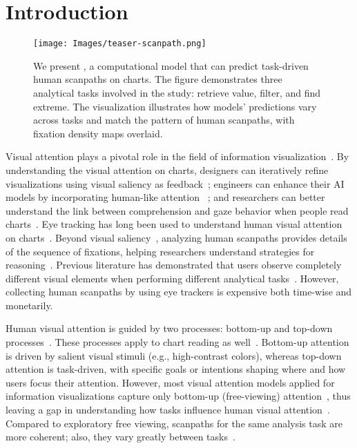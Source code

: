 \vspace{-0.5mm}
\section{Introduction}

\begin{figure*}[!t]
  \centering
  \texttt{[image: Images/teaser-scanpath.png]}
  \caption{We present \name, a computational model that can predict task-driven human scanpaths on charts. The figure demonstrates three analytical tasks involved in the study: retrieve value, filter, and find extreme. The visualization illustrates how models' predictions vary across tasks and match the pattern of human scanpaths, with fixation density maps overlaid.}
  \label{fig:teaser}
\end{figure*}

Visual attention plays a pivotal role in the field of information visualization~\cite{healey2011attention, borkin2015beyond}.
By understanding the visual attention on charts, designers can iteratively refine visualizations using visual saliency as feedback~\cite{shin2023perceptual}; engineers can enhance their AI models by incorporating human-like attention ~\cite{sood2023multimodal}; and researchers can better understand the link between comprehension and gaze behavior when people read charts~\cite{wang2024visrecall++}.
Eye tracking has long been used to understand human visual attention on charts~\cite{goldberg2011eye}.
Beyond visual saliency~\cite{shin2022scanner}, analyzing human scanpaths provides details of the sequence of fixations, helping researchers understand strategies for reasoning~\cite{wang2023scanpath}.
Previous literature has demonstrated that users observe completely different visual elements when performing different analytical tasks~\cite{polatsek2018exploring}.
However, collecting human scanpaths by using eye trackers is expensive both time-wise and monetarily.

Human visual attention is guided by two processes: bottom-up and top-down processes~\cite{itti2000saliency}. These processes apply to chart reading as well~\cite{yang2024unifying}. Bottom-up attention is driven by salient visual stimuli (e.g., high-contrast colors), whereas top-down attention is task-driven, with specific goals or intentions shaping where and how users focus their attention.
However, most visual attention models applied for information visualizations capture only bottom-up (free-viewing) attention~\cite{matzen2017data, shin2022scanner, wang2023scanpath}, thus leaving a gap in understanding how tasks influence human visual attention~\cite{amar2005low}.
Compared to exploratory free viewing, scanpaths for the same analysis task are more coherent; also, they vary greatly between tasks~\cite{polatsek2018exploring}.

